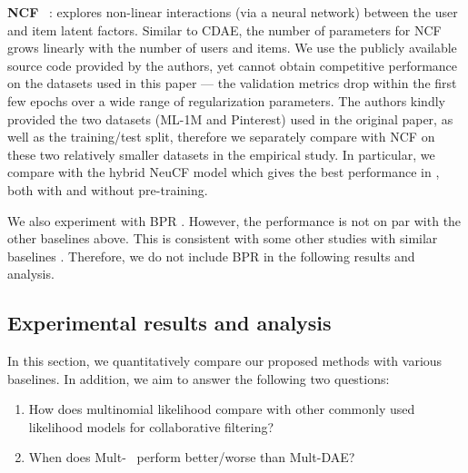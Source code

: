 \documentclass[sigconf]{acmart}
\DeclareRobustCommand{\parhead}[1]{\textbf{#1}~}
\newcommand{\mvae}{{\small Mult-}}
\newcommand{\mdae}{{\small Mult-}\gls{DAE}}
\begin{document}
\parhead{\Gls{NCF}} \citep{he2017neural}: explores non-linear interactions (via a neural network) between the user and item latent factors. Similar to \gls{CDAE}, the number of parameters for \gls{NCF} grows linearly with the number of users and items. We use the publicly available source code provided by the authors, yet cannot obtain competitive performance on the datasets used in this paper --- the validation metrics drop within the first few epochs over a wide range of regularization parameters. The authors kindly provided the two datasets (ML-1M and Pinterest) used in the original paper, as well as the training/test split, therefore we separately compare with \gls{NCF} on these two relatively smaller datasets in the empirical study. In particular, we compare with the hybrid NeuCF model which gives the best performance in \citet{he2017neural}, both with and without pre-training.

We also experiment with \gls{BPR} \citep{rendle2009bpr}. However, the performance is not on par with the other baselines above. This is consistent with some other studies with similar baselines \citep{sedhain2016effectiveness}. Therefore, we do not include \gls{BPR} in the following results and analysis. 

\subsection{Experimental results and analysis}
In this section, we quantitatively compare our proposed methods with various baselines. In addition, we aim to answer the following two questions:
\begin{enumerate}
	\item How does multinomial likelihood compare with other commonly used likelihood models for collaborative filtering?
	\item When does \mvae~ perform better/worse than \mdae?
\end{enumerate}
\end{document}
